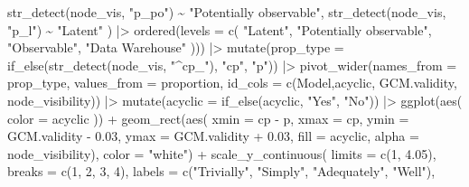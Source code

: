 \documentclass[
  letterpaper,
  DIV=11,
  numbers=noendperiod]{scrartcl}
\newenvironment{Shaded}{\begin{snugshade}}{\end{snugshade}}
\newcommand{\AttributeTok}[1]{\textcolor[rgb]{0.40,0.45,0.13}{#1}}
\newcommand{\DecValTok}[1]{\textcolor[rgb]{0.68,0.00,0.00}{#1}}
\newcommand{\FloatTok}[1]{\textcolor[rgb]{0.68,0.00,0.00}{#1}}
\newcommand{\FunctionTok}[1]{\textcolor[rgb]{0.28,0.35,0.67}{#1}}
\newcommand{\NormalTok}[1]{\textcolor[rgb]{0.00,0.23,0.31}{#1}}
\newcommand{\SpecialCharTok}[1]{\textcolor[rgb]{0.37,0.37,0.37}{#1}}
\newcommand{\StringTok}[1]{\textcolor[rgb]{0.13,0.47,0.30}{#1}}
\begin{document}
\begin{Shaded}
\begin{Highlighting}[]
        \FunctionTok{str\_detect}\NormalTok{(node\_vis, }\StringTok{"p\_po"}\NormalTok{) }\SpecialCharTok{\textasciitilde{}} \StringTok{"Potentially observable"}\NormalTok{,}
        \FunctionTok{str\_detect}\NormalTok{(node\_vis, }\StringTok{"p\_l"}\NormalTok{) }\SpecialCharTok{\textasciitilde{}} \StringTok{"Latent"}
\NormalTok{    ) }\SpecialCharTok{|\textgreater{}} 
        \FunctionTok{ordered}\NormalTok{(}\AttributeTok{levels =} \FunctionTok{c}\NormalTok{(}
            \StringTok{"Latent"}\NormalTok{,}
            \StringTok{"Potentially observable"}\NormalTok{,}
            \StringTok{"Observable"}\NormalTok{,}
            \StringTok{"Data Warehouse"}
\NormalTok{        ))) }\SpecialCharTok{|\textgreater{}} 
    \FunctionTok{mutate}\NormalTok{(}\AttributeTok{prop\_type =} \FunctionTok{if\_else}\NormalTok{(}\FunctionTok{str\_detect}\NormalTok{(node\_vis, }\StringTok{"\^{}cp\_"}\NormalTok{), }\StringTok{"cp"}\NormalTok{, }\StringTok{"p"}\NormalTok{)) }\SpecialCharTok{|\textgreater{}} 
    \FunctionTok{pivot\_wider}\NormalTok{(}\AttributeTok{names\_from =}\NormalTok{ prop\_type, }\AttributeTok{values\_from =}\NormalTok{ proportion, }\AttributeTok{id\_cols =} \FunctionTok{c}\NormalTok{(Model,acyclic, GCM.validity, node\_visibility)) }\SpecialCharTok{|\textgreater{}} 
    \FunctionTok{mutate}\NormalTok{(}\AttributeTok{acyclic =} \FunctionTok{if\_else}\NormalTok{(acyclic, }\StringTok{"Yes"}\NormalTok{, }\StringTok{"No"}\NormalTok{)) }\SpecialCharTok{|\textgreater{}}  
    \FunctionTok{ggplot}\NormalTok{(}\FunctionTok{aes}\NormalTok{(}
        \AttributeTok{color =}\NormalTok{ acyclic}
\NormalTok{    )) }\SpecialCharTok{+}
    \FunctionTok{geom\_rect}\NormalTok{(}\FunctionTok{aes}\NormalTok{(}
        \AttributeTok{xmin =}\NormalTok{ cp }\SpecialCharTok{{-}}\NormalTok{ p,}
        \AttributeTok{xmax =}\NormalTok{ cp,}
        \AttributeTok{ymin =}\NormalTok{ GCM.validity }\SpecialCharTok{{-}} \FloatTok{0.03}\NormalTok{,}
        \AttributeTok{ymax =}\NormalTok{ GCM.validity }\SpecialCharTok{+} \FloatTok{0.03}\NormalTok{,}
        \AttributeTok{fill =}\NormalTok{ acyclic,}
        \AttributeTok{alpha =}\NormalTok{ node\_visibility),}
        \AttributeTok{color =} \StringTok{"white"}\NormalTok{) }\SpecialCharTok{+}
    \FunctionTok{scale\_y\_continuous}\NormalTok{(}
        \AttributeTok{limits =} \FunctionTok{c}\NormalTok{(}\DecValTok{1}\NormalTok{, }\FloatTok{4.05}\NormalTok{),}
        \AttributeTok{breaks =} \FunctionTok{c}\NormalTok{(}\DecValTok{1}\NormalTok{, }\DecValTok{2}\NormalTok{, }\DecValTok{3}\NormalTok{, }\DecValTok{4}\NormalTok{),}
        \AttributeTok{labels =} \FunctionTok{c}\NormalTok{(}\StringTok{"Trivially"}\NormalTok{, }\StringTok{"Simply"}\NormalTok{, }\StringTok{"Adequately"}\NormalTok{, }\StringTok{"Well"}\NormalTok{),}

\end{Highlighting}
\end{Shaded}
\end{document}
